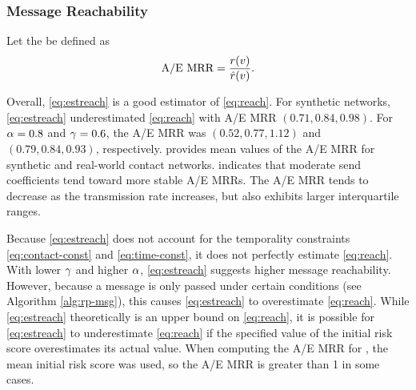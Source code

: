 \subsubsection{Message Reachability}

Let the  be defined as
\begin{equation*}
  \text{A/E MRR} = \frac{r(v)}{\hat{r}(v)}.
\end{equation*}

Overall, \cref{eq:estreach} is a good estimator of \cref{eq:reach}. For synthetic networks, \cref{eq:estreach} underestimated \cref{eq:reach} with A/E MRR $(\num{0.71}, \num{0.84}, \num{0.98})$. For $\alpha = \num{0.8}$ and $\gamma = \num{0.6}$, the A/E MRR was $(\num{0.52}, \num{0.77}, \num{1.12})$ and $(\num{0.79}, \num{0.84}, \num{0.93})$, respectively.  provides mean values of the A/E MRR for synthetic and real-world contact networks.  indicates that moderate send coefficients tend toward more stable A/E MRRs. The A/E MRR tends to decrease as the transmission rate increases, but also exhibits larger interquartile ranges.

Because \cref{eq:estreach} does not account for the temporality constraints \cref{eq:contact-const} and \cref{eq:time-const}, it does not perfectly estimate \cref{eq:reach}. With lower $\gamma$ and higher $\alpha$, \cref{eq:estreach} suggests higher message reachability. However, because a message is only passed under certain conditions (see Algorithm \ref{alg:rp-msg}), this causes \cref{eq:estreach} to overestimate \cref{eq:reach}. While \cref{eq:estreach} theoretically is an upper bound on \cref{eq:reach}, it is possible for \cref{eq:estreach} to underestimate \cref{eq:reach} if the specified value of the initial risk score overestimates its actual value. When computing the A/E MRR for , the mean initial risk score was used, so the A/E MRR is greater than 1 in some cases.

